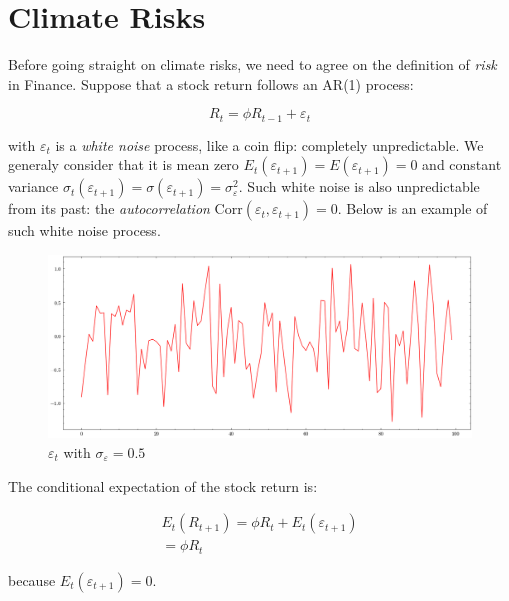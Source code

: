 \chapter{Climate Risks}

Before going straight 
on climate risks, we need to agree on 
the definition of \textit{risk} in Finance. Suppose 
that a stock return follows an AR(1) process:

\begin{equation}
    R_{t} = \phi R_ {t-1} + \varepsilon_{t}
\end{equation}

with $\varepsilon_{t}$ is a \textit{white noise} process,
like a coin flip: completely unpredictable.
We generaly consider 
that it is 
mean zero $E_t(\varepsilon_{t+1}) = E(\varepsilon_{t+1}) = 0$
and constant variance $\sigma_t(\varepsilon_{t+1}) = \sigma(\varepsilon_{t+1})= \sigma_{\varepsilon}^2$.
Such white noise is also unpredictable from its past:
the \textit{autocorrelation} $\text{Corr}(\varepsilon_{t},\varepsilon_{t+1})=0$.
Below is an example of such white noise process.

\begin{figure}[htbp]
    \centering
    \includegraphics[width=1\textwidth]{../images/chapter01/unexpected_shocks.png}
    \caption{$\varepsilon_t$ with $\sigma_{\varepsilon} = 0.5$}
    \label{fig:fig01}
\end{figure}


The conditional expectation of the stock return is:

\begin{equation}
    \begin{aligned}
    E_t(R_{t+1}) = \phi R_t + E_t(\varepsilon_{t+1}) \\
    = \phi R_t
    \end{aligned}
\end{equation}

because $E_t(\varepsilon_{t+1}) = 0$.

